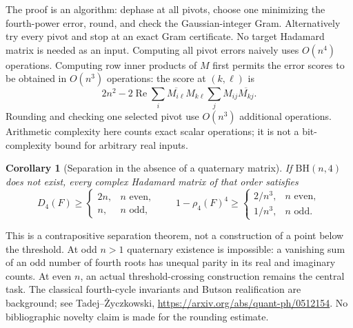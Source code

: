\documentclass[11pt]{article}
\newtheorem{corollary}[theorem]{Corollary}
\begin{document}
The proof is an algorithm: dephase at all pivots, choose one minimizing
the fourth-power error, round, and check the Gaussian-integer Gram.
Alternatively try every pivot and stop at an exact Gram certificate.
No target Hadamard matrix is needed as an input. Computing all pivot
errors naively uses $O(n^4)$ operations. Computing row inner products
of $M$ first permits the error scores to be obtained in $O(n^3)$
operations: the score at $(k,\ell)$ is
\[
 2n^2-2\operatorname{Re}\sum_i
   \overline{M_{i\ell}}M_{k\ell}
   \sum_j M_{ij}\overline{M_{kj}}.
\]
Rounding and checking one selected pivot use $O(n^3)$ additional
operations. Arithmetic complexity here counts exact scalar operations;
it is not a bit-complexity bound for arbitrary real inputs.

\begin{corollary}[Separation in the absence of a quaternary matrix]
If $\mathrm{BH}(n,4)$ does not exist, every complex Hadamard matrix
of that order satisfies
\[
 D_4(F)\ge
 \begin{cases}2n,&n\text{ even},\\n,&n\text{ odd},\end{cases}
 \qquad
 1-\rho_4(F)^4\ge
 \begin{cases}2/n^3,&n\text{ even},\\1/n^3,&n\text{ odd}.\end{cases}
\]
\end{corollary}
This is a contrapositive separation theorem, not a construction of a
point below the threshold. At odd $n>1$ quaternary existence is
impossible: a vanishing sum of an odd number of fourth roots has
unequal parity in its real and imaginary counts. At even $n$,
an actual threshold-crossing construction remains the central task.
The classical fourth-cycle invariants and Butson realification are
background; see Tadej--\.Zyczkowski,
\url{https://arxiv.org/abs/quant-ph/0512154}.
No bibliographic novelty claim is made for the rounding estimate.
\end{document}
